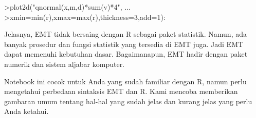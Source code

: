 \documentclass{article}
\begin{document}
\begin{eulernotebook}
\begin{eulercomment}
\begin{eulercomment}
\begin{eulercomment}
\begin{eulercomment}
\begin{eulercomment}
\begin{eulercomment}
\begin{eulercomment}
\end{eulercomment}
\begin{eulerprompt}
>plot2d("qnormal(x,m,d)*sum(v)*4", ...
>xmin=min(r),xmax=max(r),thickness=3,add=1):
\end{eulerprompt}
\begin{eulercomment}
\begin{eulercomment}
\begin{eulercomment}
Jelasnya, EMT tidak bersaing dengan R sebagai paket statistik. Namun,
ada banyak prosedur dan fungsi statistik yang tersedia di EMT juga.
Jadi EMT dapat memenuhi kebutuhan dasar. Bagaimanapun, EMT hadir
dengan paket numerik dan sistem aljabar komputer.

Notebook ini cocok untuk Anda yang sudah familiar dengan R, namun
perlu mengetahui perbedaan sintaksis EMT dan R. Kami mencoba
memberikan gambaran umum tentang hal-hal yang sudah jelas dan kurang
jelas yang perlu Anda ketahui.


\end{eulercomment}
\end{eulercomment}
\end{eulercomment}
\end{eulercomment}
\end{eulercomment}
\end{eulercomment}
\end{eulercomment}
\end{eulercomment}
\end{eulercomment}
\end{eulernotebook}
\end{document}
